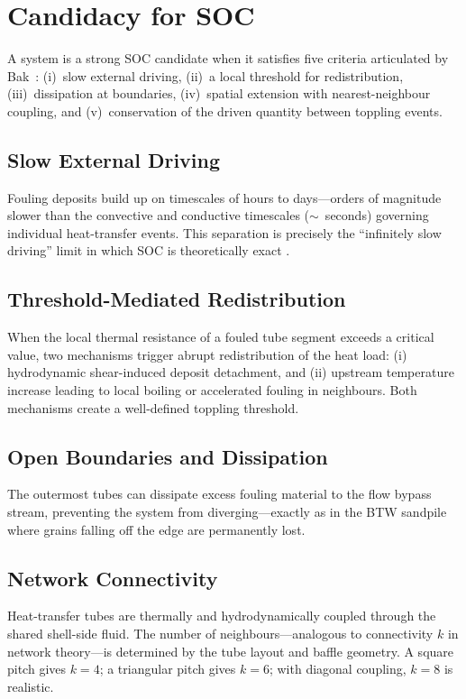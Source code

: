 \documentclass[10pt,a4paper,twocolumn]{article}
\begin{document}
\section{Candidacy for SOC}
\label{sec:candidate}

A system is a strong SOC candidate when it satisfies five criteria
articulated by Bak~\cite{bak1996}: (i)~slow external driving,
(ii)~a local threshold for redistribution, (iii)~dissipation at
boundaries, (iv)~spatial extension with nearest-neighbour coupling, and
(v)~conservation of the driven quantity between toppling events.

\subsection{Slow External Driving}

Fouling deposits build up on timescales of hours to days---orders of
magnitude slower than the convective and conductive timescales ($\sim$~seconds)
governing individual heat-transfer events. This separation is precisely the
``infinitely slow driving'' limit in which SOC is theoretically exact
\cite{bak1987}.

\subsection{Threshold-Mediated Redistribution}

When the local thermal resistance of a fouled tube segment exceeds a critical
value, two mechanisms trigger abrupt redistribution of the heat load: (i)
hydrodynamic shear-induced deposit detachment, and (ii) upstream temperature
increase leading to local boiling or accelerated fouling in neighbours.
Both mechanisms create a well-defined toppling threshold.

\subsection{Open Boundaries and Dissipation}

The outermost tubes can dissipate excess fouling material to the flow
bypass stream, preventing the system from diverging---exactly as in the BTW
sandpile where grains falling off the edge are permanently lost.

\subsection{Network Connectivity}

Heat-transfer tubes are thermally and hydrodynamically coupled through the
shared shell-side fluid. The number of neighbours---analogous to connectivity
$k$ in network theory---is determined by the tube layout and baffle geometry.
A square pitch gives $k=4$; a triangular pitch gives $k=6$; with diagonal
coupling, $k=8$ is realistic.
\end{document}

